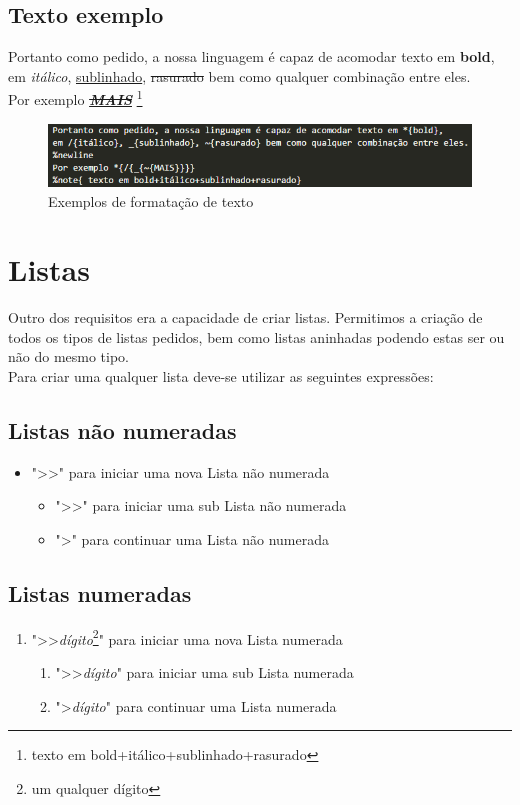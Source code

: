 \documentclass{report}
\begin{document}
\subsection{Texto exemplo
}
Portanto como pedido, a nossa linguagem é capaz de acomodar texto em \textbf{bold}, 
em \textit{itálico}, \underline{sublinhado}, \sout{rasurado} bem como qualquer combinação entre eles. 
\\
Por exemplo \textbf{\textit{\underline{\sout{MAIS}}}} 
\footnote{{ texto em bold+itálico+sublinhado+rasurado}}

\begin{figure}[h]
	\centering
	\includegraphics[scale=0.9]{formatacao_source.png}
	\caption{Exemplos de formatação de texto}
\end{figure}


\newpage

\section{Listas
}
Outro dos requisitos era a capacidade de criar listas.
Permitimos a criação de todos os tipos de listas pedidos, 
bem como listas aninhadas podendo estas ser ou não do mesmo tipo.
\\
Para criar uma qualquer lista deve-se utilizar as seguintes expressões:
\subsection{Listas não numeradas
}
\begin{itemize}
\item  "\textgreater\textgreater*"  para iniciar uma nova Lista não numerada
    \begin{itemize}
\item  "\textgreater\textgreater*"  para iniciar uma sub Lista não numerada
    \item  "\textgreater*" para continuar uma Lista não numerada
    \end{itemize}
\end{itemize} 
\subsection{Listas numeradas
}
\begin{enumerate}
\item  "\textgreater\textgreater\textit{dígito}\footnote{{um qualquer dígito}}" para iniciar uma nova Lista numerada
    \begin{enumerate}
\item  "\textgreater\textgreater\textit{dígito}" para iniciar uma sub Lista numerada
    \item  "\textgreater\textit{dígito}" para continuar uma Lista numerada
    \end{enumerate}
\end{enumerate}
\end{document}
